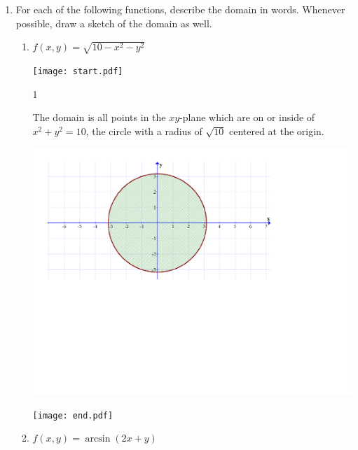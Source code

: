 \documentclass[12pt]{article}
\begin{document}
\begin{enumerate}

\item For each of the following functions, describe the domain in words.  Whenever possible, draw a sketch of the domain as well.

\begin{enumerate}

\item $f(x,y)=\sqrt{10-x^2-y^2}$

\texttt{[image: start.pdf]}
{{{1\linewidth}{The domain is all points in the $xy$-plane which are on or inside of $x^2+y^2=10$, the circle with a radius of $\sqrt{10}$ centered at the origin.
\begin{center}
\includegraphics[scale=0.4]{domain1.pdf}
\end{center}}}}
\texttt{[image: end.pdf]}


\item $f(x,y)=\arcsin{(2x+y)}$


\end{enumerate}
\end{enumerate}
\end{document}
